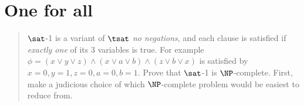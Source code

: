 \section*{One for all }
    \begin{quote}
    $\sat$-1 is a variant of $\tsat$ \emph{no negations}, and each clause is satisfied if \emph{exactly one} of its 3 variables is true.
    For example $\phi = (x \vee y \vee z) \wedge (x \vee a \vee b) \wedge (z \vee b \vee x)$ is satisfied by $x=0,y=1,z=0,a=0,b=1$.
    Prove that $\sat$-1 is $\NP$-complete.
    First, make a judicious choice of which $\NP$-complete problem would be easiest to reduce from.
    \end{quote}



